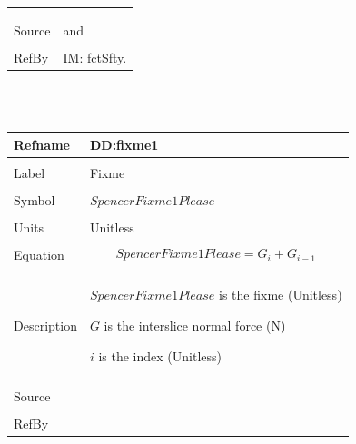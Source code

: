 \documentclass[12pt]{article}
\begin{document}
\begin{minipage}{\textwidth}
\begin{tabular}{p{} p{}}
\begin{symbDescription}
                                                  \end{symbDescription}
                                                  \\ \midrule \\
                                                  Source & \cite{chen2005} and \cite{karchewski2012}
                                                           \\ \midrule \\
                                                           RefBy & \hyperref[IM:fctSfty]{IM: fctSfty}.
\\ \bottomrule \end{tabular}
\end{minipage}\\
~\newline
 \noindent \begin{minipage}{\textwidth}
\begin{tabular}{p{} p{}}
\toprule \textbf{Refname} & \textbf{DD:fixme1}
\label{DD:fixme1}
\\ \midrule \\
Label & Fixme
        \\ \midrule \\
        Symbol & $SpencerFixme1Please$
                 \\ \midrule \\
                 Units & Unitless
                         \\ \midrule \\
                         Equation & \begin{dmath}
                                    SpencerFixme1Please=G_{i}+G_{i-1}
                                    \end{dmath}
                                    \\ \midrule \\
                                    Description & \begin{symbDescription}
                                                  \item{$SpencerFixme1Please$ is the fixme (Unitless)}
                                                  \item{$G$ is the interslice normal force (N)}
                                                  \item{$i$ is the index (Unitless)}
                                                  \end{symbDescription}
                                                  \\ \midrule \\
                                                  Source & \\ \midrule \\
                                                           RefBy & 
\\ \bottomrule \end{tabular}
\end{minipage}\\
\end{document}

